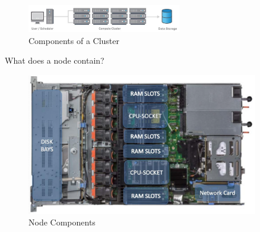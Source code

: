 \begin{figure}[H]
    \centering
    \includegraphics[width=0.6\textwidth]{assets/fig22.png}
    \caption{Components of a Cluster}
\end{figure}

\begin{minipage}[t]{0.45\textwidth}
    \vspace{2.5cm}
    What does a node contain?
\end{minipage}
\begin{minipage}[t]{0.45\textwidth}
    \begin{figure}[H]
        \centering
        \includegraphics[width=0.9\textwidth]{assets/fig23.png}
        \caption{Node Components}
    \end{figure}
\end{minipage}

